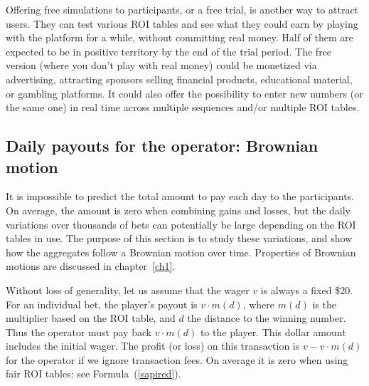\documentclass[oneside,10pt]{book}
\begin{document}
Offering free simulations to participants, or a free trial, is another way to attract users. They can test various ROI tables and see what they could earn by playing with the platform for a while, without committing real money. Half of them are expected to be in positive territory by the end of the trial period. The free version (where you don't play with real money) could be monetized via advertising, attracting sponsors selling financial products, educational material, or gambling platforms. It could also offer the possibility to enter new numbers (or the same one) in real time across multiple sequences and/or multiple ROI tables.


\subsection{Daily payouts for the operator: Brownian motion}\label{pozwed}

It is impossible to predict the total amount to pay each day to the participants. On average, the amount
 is zero when combining gains and losses, but the daily variations over thousands of bets can potentially be large depending on the ROI tables in use. The purpose of this section is to study these variations, and show how the aggregates follow
 a \textcolor{index}{Brownian motion} over time.
 Properties of Brownian motions are discussed in chapter~\ref{ch1}.

Without loss of generality, let us assume that the wager $v$ is always a fixed \$20. For an individual bet,
 the player's payout is $v\cdot m(d)$, where $m(d)$ is the multiplier based on the ROI table, and $d$ the distance to the winning number. Thus the operator must pay back
     $v\cdot m(d)$ to the player. This dollar amount includes the initial wager. The profit (or loss) on this transaction is
$v-v\cdot m(d)$ for the operator if we ignore transaction fees. On average it is zero when using fair ROI tables: see  Formula~(\ref{sapired}).
\end{document}
